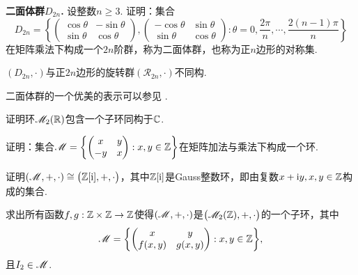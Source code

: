 \begin{mybox}
  \begin{problem}
    {\bfseries 二面体群$D_{2n}$.}
    设整数$n\ge3$. 证明：集合
    \[
      D_{2n} = \left\{
        \begin{pmatrix}
          \cos\theta &  -\sin\theta \\
          \sin\theta & \cos \theta
        \end{pmatrix},\begin{pmatrix}
          -\cos\theta & \sin\theta \\
          \sin\theta  & \cos\theta
        \end{pmatrix}:\theta = 0,\frac{2\pi}n,\cdots,\frac{2(n-1)\pi}n
      \right\}
    \]
    在矩阵乘法下构成一个$2n$阶群，称为{\kaishu 二面体群}，也称为正$n$边形的对称集.
    \begin{nota}
      $(D_{2n},\cdot)$与正$2n$边形的旋转群$(\mathscr R_{2n},\cdot)$不同构.
    \end{nota}
  \end{problem}
\end{mybox}

二面体群的一个优美的表示可以参见 \cite[p.23]{17}.

\begin{problem}
  证明环$\mathscr M_2(\mathbb R)$包含一个子环同构于$\mathbb C$.
\end{problem}

\begin{problem}
  \begin{enumerate*}[label=(\alph*),itemjoin=
    \\\hspace*{\parindent}]
    \item 证明：集合$\MM=\left\{
      \begin{pmatrix}
        x & y \\
        -y & x
      \end{pmatrix}:x,y\in\MZ
    \right\}$在矩阵加法与乘法下构成一个环.
    \item 证明$(\mathscr M,+,\cdot)\cong\big(\mathbb Z[\mathrm i],+,\cdot\big)$，其中$\mathbb Z[\mathrm i]$是{\kaishu Gauss整数环}，即由复数$x+\mathrm i y,x,y\in\mathbb Z$构成的集合.
  \end{enumerate*}
\end{problem}

\begin{mybox}
  \begin{problem}
    求出所有函数$f,g:\mathbb Z\times\mathbb Z\to\mathbb Z$使得$(\mathscr M,+,\cdot)$是$\big(\mathscr M_2(\mathbb Z),+,\cdot\big)$的一个子环，其中
    \[
      \MM = \left\{
        \begin{pmatrix}
          x & y \\
          f(x,y) & g(x,y)
        \end{pmatrix}:x,y\in\MZ
      \right\},
    \]
    且$I_2\in\mathscr M$.
  \end{problem}
\end{mybox}

